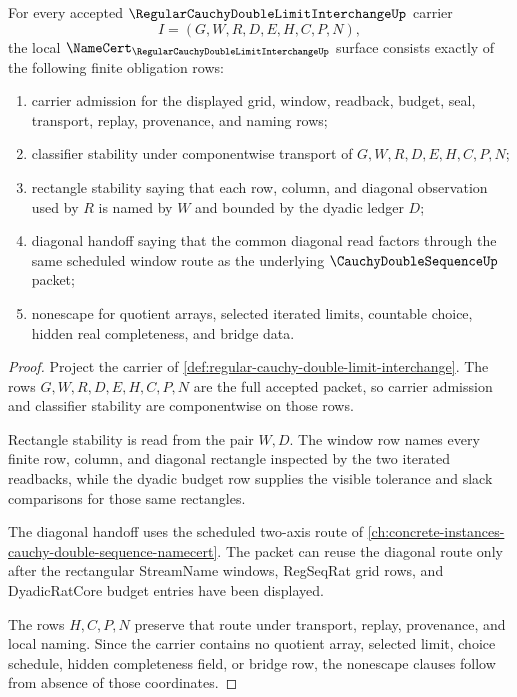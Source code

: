 \begin{theorem}
\label{thm:regular-cauchy-double-limit-interchange-namecert-obligations}
For every accepted $\RegularCauchyDoubleLimitInterchangeUp$ carrier
$$
I=(G,W,R,D,E,H,C,P,N),
$$
the local $\NameCert_{\RegularCauchyDoubleLimitInterchangeUp}$ surface consists exactly of the following finite obligation rows:
\begin{enumerate}
\item carrier admission for the displayed grid, window, readback, budget, seal, transport, replay, provenance, and naming rows;
\item classifier stability under componentwise transport of $G,W,R,D,E,H,C,P,N$;
\item rectangle stability saying that each row, column, and diagonal observation used by $R$ is named by $W$ and bounded by the dyadic ledger $D$;
\item diagonal handoff saying that the common diagonal read factors through the same scheduled window route as the underlying $\CauchyDoubleSequenceUp$ packet;
\item nonescape for quotient arrays, selected iterated limits, countable choice, hidden real completeness, and bridge data.
\end{enumerate}
\end{theorem}
\begin{proof}
Project the carrier of \autoref{def:regular-cauchy-double-limit-interchange}. The rows $G,W,R,D,E,H,C,P,N$ are the full accepted packet, so carrier admission and classifier stability are componentwise on those rows.

Rectangle stability is read from the pair $W,D$. The window row names every finite row, column, and diagonal rectangle inspected by the two iterated readbacks, while the dyadic budget row supplies the visible tolerance and slack comparisons for those same rectangles.

The diagonal handoff uses the scheduled two-axis route of \autoref{ch:concrete-instances-cauchy-double-sequence-namecert}. The packet can reuse the diagonal route only after the rectangular StreamName windows, RegSeqRat grid rows, and DyadicRatCore budget entries have been displayed.

The rows $H,C,P,N$ preserve that route under transport, replay, provenance, and local naming. Since the carrier contains no quotient array, selected limit, choice schedule, hidden completeness field, or bridge row, the nonescape clauses follow from absence of those coordinates.
\end{proof}


